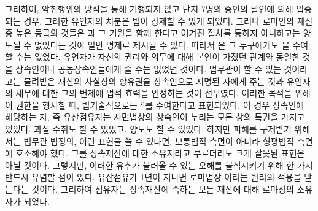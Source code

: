 그리하여,
악취행위의 방식을 통해 거행되지 않고
단지 7명의 증인의 날인에 의해 입증되는 경우,
그러한 유언자의 처분은 법이 강제할 수 있게 되었다.
그러나
로마인의 재산 중 높은 등급의 것들은
과 그 기원을 함께 한다고 여겨진 절차를 통하지 아니하고는
양도될 수 없었다는 것이 일반 명제로 제시될 수 있다.
따라서 은 그 누구에게도 을 수여할 수는 없었다.
유언자가 자신의 권리와 의무에 대해 본인이 가졌던 관계와 동일한 것을
상속인이나 공동상속인들에게 줄 수는 없었던 것이다.
법무관이 할 수 있는 것이라고는
물려받은 재산의 사실상의 향유권을
상속인으로 지명된 자에게
주는 것과
유언자의 채무에 대한 그의 변제에 법적 효력을 인정하는 것이
전부였다.
이러한 목적을 위해 이 권한을 행사할 때,
법기술적으로는
`'를 수여한다고
표현되었다.
이 경우 상속인에 해당하는 자, 즉 유산점유자는
시민법상의 상속인이 누리는 모든 상의 특권을 가지고 있었다.
과실 수취도 할 수 있었고, 양도도 할 수 있었다.
하지만 피해를 구제받기 위해서는 법무관 법정의,
이런 표현을 쓸 수 있다면, 보통법적 측면이 아니라
형평법적 측면에 호소해야 했다.
%
그를 상속재산에 대한  소유자라고
부르더라도 크게 잘못된 표현은 아닐 것이다.
그렇지만,
이러한 유추가 불러올 수 있는 오해를 불식시키기 위해
한 가지 반드시 유념할 점이 있다.
유산점유가
1년이 지나면
로마법상 이라는 원리의 적용을 받는다는 것이다.
그리하여
점유자는 상속재산에 속하는 모든 재산에 대해
로마상의 소유자가 되었다.

